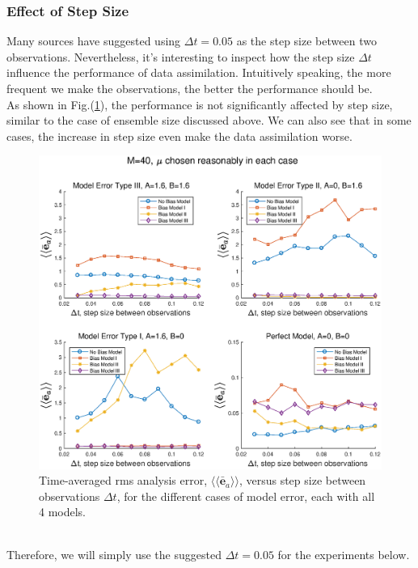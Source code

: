 \documentclass[twocolumn]{article}
\begin{document}
\subsubsection{Effect of Step Size}
Many sources have suggested using $\Delta t=0.05$ as the step size between two observations. Nevertheless, it's interesting to inspect how the step size $\Delta t$ influence the performance of data assimilation. Intuitively speaking, the more frequent we make the observations, the better the performance should be.\\
As shown in Fig.(\ref{AErrVsDeltaT1}), the performance is not significantly affected by step size, similar to the case of ensemble size discussed above. We can also see that in some cases, the increase in step size even make the data assimilation worse.
\begin{figure} 
\centering
\includegraphics[scale=0.3]{Figures/AErrVsDeltaT1}
\caption{Time-averaged rms analysis error, $\langle\langle\bar{\pmb{e}}_a\rangle\rangle$, versus step size between observations $\Delta t$, for the different cases of model error, each with all 4 models.}
\label{AErrVsDeltaT1}
\end{figure}\\
Therefore, we will simply use the suggested $\Delta t=0.05$ for the experiments below.
\end{document}
